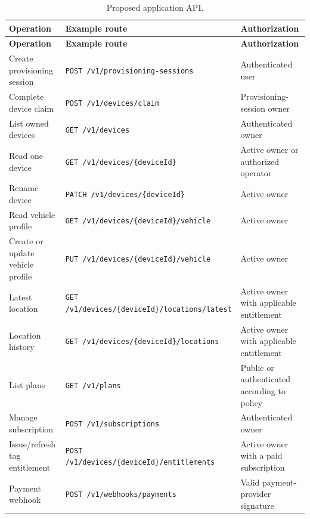 \documentclass[12pt,a4paper]{article}
\newcommand{\code}[1]{\texttt{#1}}
\begin{document}
\begin{longtable}{p{4.0cm}p{5.3cm}p{5.0cm}}
    \caption{Proposed application API.} \\
    \toprule
    \textbf{Operation} & \textbf{Example route} & \textbf{Authorization} \\
    \midrule
    \endfirsthead
    \toprule
    \textbf{Operation} & \textbf{Example route} & \textbf{Authorization} \\
    \midrule
    \endhead

    Create provisioning session &
    \code{POST /v1/provisioning-sessions} &
    Authenticated user \\

    Complete device claim &
    \code{POST /v1/devices/claim} &
    Provisioning-session owner \\

    List owned devices &
    \code{GET /v1/devices} &
    Authenticated owner \\

    Read one device &
    \code{GET /v1/devices/\{deviceId\}} &
    Active owner or authorized operator \\

    Rename device &
    \code{PATCH /v1/devices/\{deviceId\}} &
    Active owner \\

    Read vehicle profile &
    \code{GET /v1/devices/\{deviceId\}/vehicle} &
    Active owner \\

    Create or update vehicle profile &
    \code{PUT /v1/devices/\{deviceId\}/vehicle} &
    Active owner \\

    Latest location &
    \code{GET /v1/devices/\{deviceId\}/locations/latest} &
    Active owner with applicable entitlement \\

    Location history &
    \code{GET /v1/devices/\{deviceId\}/locations} &
    Active owner with applicable entitlement \\

    List plans &
    \code{GET /v1/plans} &
    Public or authenticated according to policy \\

    Manage subscription &
    \code{POST /v1/subscriptions} &
    Authenticated owner \\

    Issue/refresh tag entitlement &
    \code{POST /v1/devices/\{deviceId\}/entitlements} &
    Active owner with a paid subscription \\

    Payment webhook &
    \code{POST /v1/webhooks/payments} &
    Valid payment-provider signature \\
    \bottomrule
\end{longtable}
\end{document}
